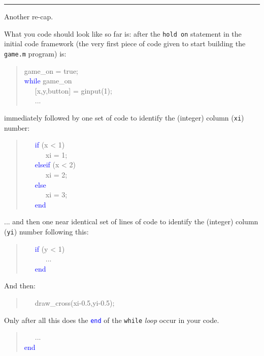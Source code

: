 \documentclass{tufte-book} %
\newenvironment{docspec}{\begin{quotation}\ttfamily\parskip0pt\parindent0pt\ignorespaces}{\end{quotation}}
\begin{document}
\vspace{1mm}
\noindent\rule{4cm}{0.5pt}
\vspace{2mm}

\newpage

\noindent Another re-cap.

What you code should look like so far is: after the \texttt{hold on} statement in the initial code framework (the very first piece of code given to start building the \texttt{game.m} program) is:
\begin{docspec}
game\_on = true;\\
\textcolor{blue}{while} game\_on\\
\ \ \    [x,y,button] = ginput(1);\\
\ \ \  ...
\end{docspec}
immediately followed by one set of code to identify the (integer) column (\texttt{xi}) number:
\vspace{-1mm}\begin{docspec}
\ \ \    \textcolor{blue}{if} (x < 1)\\
\ \ \ \ \ \             xi = 1;\\
\ \ \        \textcolor{blue}{elseif} (x < 2)\\
\ \ \ \ \ \             xi = 2;\\       
\ \ \        \textcolor{blue}{else}\\
\ \ \ \ \ \             xi = 3;\\
\ \ \        \textcolor{blue}{end}
\end{docspec}\vspace{-1mm}
... and then one near identical set of lines of code to identify the (integer) column  (\texttt{yi}) number following this:
\vspace{-1mm}\begin{docspec}
\ \ \    \textcolor{blue}{if} (y < 1)\\
\ \ \ \ \ \  ...\\
\ \ \        \textcolor{blue}{end}
\end{docspec}\vspace{-1mm}
And then:
\begin{docspec}
\ \ \  draw\_cross(xi-0.5,yi-0.5);
\end{docspec}

\noindent Only after all this does the \texttt{\textcolor{blue}{end}} of the \texttt{while} \textit{loop} occur in your code.
\begin{docspec}
\ \ \  ...\\
\textcolor{blue}{end}
\end{docspec}
\end{document}
